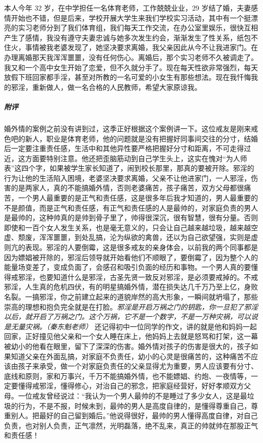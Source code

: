 \begin{case}
    本人今年 32 岁，在中学担任一名体育老师，工作兢兢业业，29 岁结了婚，夫妻感情开始也不错，但是后来，学校开展大学生来我们学校实习活动，其中有一个挺漂亮的实习老师分到了我们体育组，我们每天工作交流，在办公室里娱乐，很快互相产生了感情，我没有遵守夫妻忠诚与她多次发生约会，渐渐发生了性关系，纸包不住火，事情被我老婆发现了，她坚决要求离婚，我父亲因此从今不让我进家门。在办理离婚那天我浑浑噩噩，没有任何伤心。离婚后，那个实习老师不久被调走了。我又和一个高中女生开始了恋爱，但不久就分手了。现在每天性欲非常强烈，每天放假下班回家都手淫，甚至对所教的一名可爱的小女生有那些想法。现在我忏悔我的邪淫，重新做人，做一名合格的人民教师，希望大家原谅我。
    \subparagraph{附评} 婚外情的案例之前没有讲到过，这季正好根据这个案例讲一下。这位戒友是刚来戒色吧的新人，职业是体育老师，他的问题就是没有把握好同事间交往的分寸，结婚后一定要注重责任感，生活中和其他异性要严格把握好分寸和距离，不可走得过近，这方面要特别注意。他还把歪脑筋动到自己学生头上，这实在愧对“为人师表”这四个字，如果被学生家长知道了，闹到校长那里，那真的要被开除。邪淫的行为让他的生活陷入困境，老婆坚决要求离婚，父亲不让他进家门，一人邪淫，伤害的是两家人，真的不能搞婚外情，否则老婆痛苦，孩子痛苦，双方父母都很痛苦，一个男人最重要的是正气和责任感，这是很多年后我才知道的，男人最重要的不是颜值，而是正气和责任感，有正气和责任感的人是最帅的，对家庭负责的男人是最帅的，这种帅真的是帅到骨子里了，帅得很深沉，很有智慧，很有分量。否则即使和一百个女人发生关系，也是毫无意义的，只会让自己越来越垃圾，越来越空虚、颓废，浑浑噩噩，到处乱搞，沦为纵欲的禽兽，还以为自己欲望强，实则是虚则亢的表现。邪淫的人要倒霉，这是很多戒友的亲身体会，以前我的两个同事都是因为嫖娼被开除的，邪淫后领导就开始看他们不顺眼了，要倒霉了，因为整个人的能量场变差了，变成负面了，会感召和吸引负面的经历和事物。一个男人真的要懂得戒邪淫，也要知道什么是邪淫，古圣先贤一致反对邪淫，是必须要戒掉的。不戒邪淫，人生真的危机四伏，有的明星搞婚外情，潜在损失达几千万乃至上亿，身败名裂。一搞邪淫，你之前建立起来的道貌岸然的高大形象，一瞬间就坍塌了，那些崇高的理想和抱负完全就是在打脸。\textit{邪淫是开启万祸之门的钥匙，你一旦犯了邪淫以后，就开启了万祸之门。这个万祸，它不是一个数字，不是一万种灾祸，可以说是无量灾祸。（秦东魁老师）} 还记得初中一位同学的作文，讲的就是他和妈妈一起回家，正好撞见他父亲和一个女人睡在床上，他妈妈上去就是怒骂和打架，这一幕被幼小的他看在眼里，留下了深深的伤害。婚外情对孩子的伤害是很大的，孩子如果知道父亲在外面乱搞，对家庭不负责任，幼小的心灵是很痛苦的，这种痛苦不应该由孩子来承受，做一个对家庭负责任的父亲显得尤为重要，男人应该要有分寸、底线和原则，家和万事兴，千万不能搞婚外情，也不能嫖娼、约炮、一夜情等，一定要懂得戒邪淫，懂得修心，对治自己的邪念，把家庭经营好，好好孝顺双方父母。一位戒友曾经说过：“我认为一个男人最帅的不是睡过了多少女人，这是最垃圾的行为，不是不报，时候未到，最帅的男人是高度自律的，是懂得尊重自己，尊重别人。把最好的自己留到婚后。”他说得很好，最帅的男人懂得高度自律，对自己负责，也对别人负责，正气凛然，光明磊落，绝不乱来，真正的帅就帅在那股正气和责任感！
\end{case}

